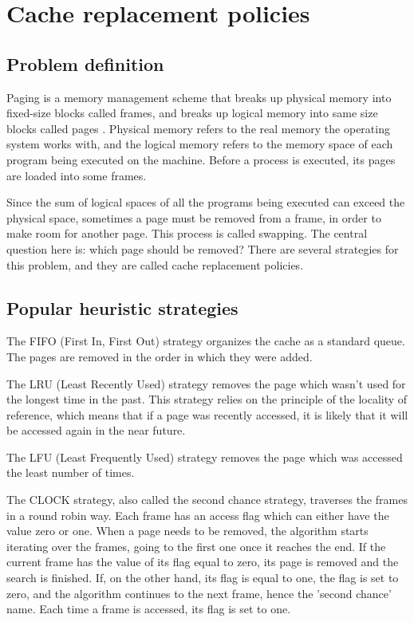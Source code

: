 \section{Cache replacement policies}
\subsection{Problem definition}
Paging is a memory management scheme that breaks up physical memory into fixed-size blocks called frames, and breaks up logical memory into same size blocks called pages \citep{silberschatz2018operatingsystem}. Physical memory refers to the real memory the operating system works with, and the logical memory refers to the memory space of each program being executed on the machine. Before a process is executed, its pages are loaded into some frames.

Since the sum of logical spaces of all the programs being executed can exceed the physical space, sometimes a page must be removed from a frame, in order to make room for another page. This process is called swapping. The central question here is: which page should be removed? There are several strategies for this problem, and they are called cache replacement policies.

\subsection{Popular heuristic strategies}
The FIFO (First In, First Out) strategy organizes the cache as a standard queue. The pages are removed in the order in which they were added.

The LRU (Least Recently Used) strategy removes the page which wasn't used for the longest time in the past. This strategy relies on the principle of the locality of reference, which means that if a page was recently accessed, it is likely that it will be accessed again in the near future.

The LFU (Least Frequently Used) strategy removes the page which was accessed the least number of times.

The CLOCK strategy, also called the second chance strategy, traverses the frames in a round robin way. Each frame has an access flag which can either have the value zero or one. When a page needs to be removed, the algorithm starts iterating over the frames, going to the first one once it reaches the end. If the current frame has the value of its flag equal to zero, its page is removed and the search is finished. If, on the other hand, its flag is equal to one, the flag is set to zero, and the algorithm continues to the next frame, hence the 'second chance' name. Each time a frame is accessed, its flag is set to one.

